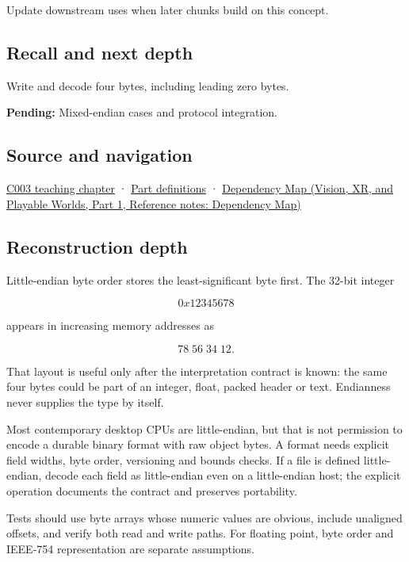 \hypertarget{appendix-367b6abf460e-used-by}{}

Update downstream uses when later chunks build on this concept.

\subsection{Recall and next depth}\label{appendix-367b6abf460e-recall-and-next-depth}

\hypertarget{appendix-367b6abf460e-recall-and-next-depth}{}

Write and decode four bytes, including leading zero bytes.

\textbf{Pending:} Mixed-endian cases and protocol integration.

\subsection{Source and navigation}\label{appendix-367b6abf460e-source-and-navigation}

\hypertarget{appendix-367b6abf460e-source-and-navigation}{}

\hyperref[01-foundations-i-ch002-where-the-bytes-live]{C003 teaching chapter} · \hyperref[appendix-fd090d982a15-m003---parts-41-60]{Part definitions} · \href{../07-Vision-XR-and-Playable-Worlds-P01/main.pdf\#nameddest=appendix-4ad47bdd269a}{Dependency Map (Vision, XR, and Playable Worlds, Part 1, Reference notes: Dependency Map)}

\subsection{Reconstruction depth}\label{appendix-367b6abf460e-reconstruction-depth}

\hypertarget{appendix-367b6abf460e-reconstruction-depth}{}

Little-endian byte order stores the least-significant byte first. The 32-bit integer

\[
0x12345678
\]

appears in increasing memory addresses as

\[
78\;56\;34\;12.
\]

That layout is useful only after the interpretation contract is known: the same four bytes could be part of an integer, float, packed header or text. Endianness never supplies the type by itself.

Most contemporary desktop CPUs are little-endian, but that is not permission to encode a durable binary format with raw object bytes. A format needs explicit field widths, byte order, versioning and bounds checks. If a file is defined little-endian, decode each field as little-endian even on a little-endian host; the explicit operation documents the contract and preserves portability.

Tests should use byte arrays whose numeric values are obvious, include unaligned offsets, and verify both read and write paths. For floating point, byte order and IEEE-754 representation are separate assumptions.
